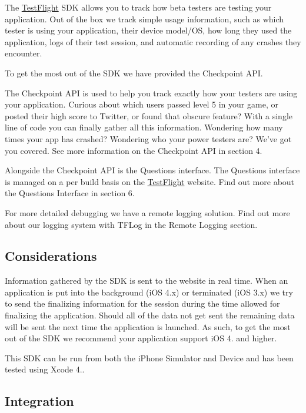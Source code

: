 The \hyperlink{interface_test_flight}{Test\-Flight} S\-D\-K allows you to track how beta testers are testing your application. Out of the box we track simple usage information, such as which tester is using your application, their device model/\-O\-S, how long they used the application, logs of their test session, and automatic recording of any crashes they encounter.

To get the most out of the S\-D\-K we have provided the Checkpoint A\-P\-I.

The Checkpoint A\-P\-I is used to help you track exactly how your testers are using your application. Curious about which users passed level 5 in your game, or posted their high score to Twitter, or found that obscure feature? With a single line of code you can finally gather all this information. Wondering how many times your app has crashed? Wondering who your power testers are? We've got you covered. See more information on the Checkpoint A\-P\-I in section 4.

Alongside the Checkpoint A\-P\-I is the Questions interface. The Questions interface is managed on a per build basis on the \hyperlink{interface_test_flight}{Test\-Flight} website. Find out more about the Questions Interface in section 6.

For more detailed debugging we have a remote logging solution. Find out more about our logging system with T\-F\-Log in the Remote Logging section.

\subsection*{Considerations}

Information gathered by the S\-D\-K is sent to the website in real time. When an application is put into the background (i\-O\-S 4.\-x) or terminated (i\-O\-S 3.\-x) we try to send the finalizing information for the session during the time allowed for finalizing the application. Should all of the data not get sent the remaining data will be sent the next time the application is launched. As such, to get the most out of the S\-D\-K we recommend your application support i\-O\-S 4. and higher.

This S\-D\-K can be run from both the i\-Phone Simulator and Device and has been tested using Xcode 4..

\subsection*{Integration}


